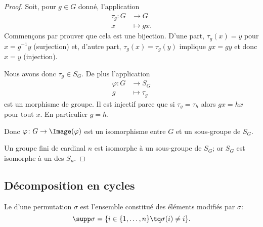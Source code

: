 \begin{proof}
    Soit, pour \( g\in G\) donné, l'application
    \begin{equation}
        \begin{aligned}
            \tau_g\colon G&\to G \\
            x&\mapsto gx.
        \end{aligned}
    \end{equation}
    Commençons par prouver que cela est une bijection.  D'une part, \( \tau_g(x)=y\) pour \( x=g^{-1} y\) (surjection) et, d'autre part, \( \tau_g(x)=\tau_g(y)\) implique \( gx=gy\) et donc \( x=y\) (injection).

    Nous avons donc \( \tau_g\in S_G\). De plus l'application
    \begin{equation}
        \begin{aligned}
            \varphi\colon G&\to S_G \\
            g&\mapsto \tau_g
        \end{aligned}
    \end{equation}
    est un morphisme de groupe. Il est injectif parce que si \( \tau_g=\tau_h\) alors \( gx=hx\) pour tout \( x\). En particulier \( g=h\).

    Donc \( \varphi\colon G\to \Image(\varphi)\) est un isomorphisme entre \( G\) et un sous-groupe de \( S_G\).

    Un groupe fini de cardinal \( n\) est isomorphe à un sous-groupe de \( S_G\); or \( S_G\) est isomorphe à un des \( S_n\).
\end{proof}
\subsection{Décomposition en cycles}

\begin{definition}      \label{DEFooSupportPermutation}
    Le  d'une permutation $\sigma$ est l'ensemble constitué des éléments modifiés par $\sigma$:
    \begin{equation*}
        \supp \sigma = \{ i \in \{1,\ldots,n \} \tq \sigma(i) \neq i\}.
    \end{equation*}
\end{definition}

